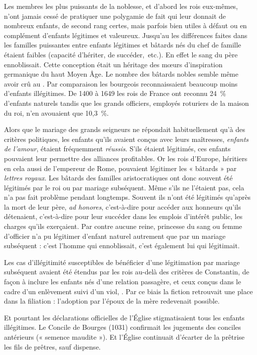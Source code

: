  Les membres les plus puissants de la noblesse, et d'abord les rois eux-mêmes, n'ont jamais cessé de pratiquer une polygamie de fait qui leur donnait de nombreux enfants, de second rang certes, mais parfois bien utiles à défaut ou en complément d'enfants légitimes et valeureux. Jusqu'au  les différences faites dans les familles puissantes entre enfants légitimes et bâtards nés du chef de famille étaient faibles (capacité d'hériter, de succéder,~etc.). En effet le sang du père ennoblissait. Cette conception était un héritage des mœurs d'inspiration germanique du haut Moyen Âge. Le nombre des bâtards nobles semble même avoir crû au  . Par comparaison les bourgeois reconnaissaient beaucoup moins d'enfants illégitimes. De 1400 à 1649 les rois de France ont reconnu 24~\% d'enfants naturels tandis que les grands officiers, employés roturiers de la maison du roi, n'en avouaient que 10,3~\%. 

 Alors que le mariage des grands seigneurs ne répondait habituellement qu'à des critères politiques, les enfants qu'ils avaient conçus avec leurs maîtresses, \emph{enfants de l'amour}, étaient fréquemment \emph{réussis}. S'ils étaient légitimés, ces enfants pouvaient leur permettre des alliances profitables. Or les rois d'Europe, héritiers en cela aussi de l'empereur de Rome, pouvaient légitimer les « bâtards » par \emph{lettres royaux}. Les bâtards des familles aristocratiques ont donc souvent été légitimés par le roi ou par mariage subséquent. Même s'ils ne l'étaient pas, cela n'a pas fait problème pendant longtemps. Souvent ils n'ont été légitimés qu'après la mort de leur père, \emph{ad honores}, c'est-à-dire pour accéder aux honneurs qu'ils détenaient, c'est-à-dire pour leur succéder dans les emplois d'intérêt public, les charges qu'ils exerçaient. Par contre aucune reine, princesse du sang ou femme d'officier n'a pu légitimer d'enfant naturel autrement que par un mariage subséquent : c'est l'homme qui ennoblissait, c'est également lui qui légitimait. 

 Les cas d'illégitimité susceptibles de bénéficier d'une légitimation par mariage subséquent avaient été étendus par les rois au-delà des critères de Constantin, de façon à inclure les enfants nés d'une relation passagère, et ceux conçus dans le cadre d'un enlèvement suivi d'un viol, . Par ce biais la fiction retrouvait une place dans la filiation : l'adoption par l'époux de la mère redevenait possible. 

 Et pourtant les déclarations officielles de l'Église stigmatisaient tous les enfants illégitimes. Le Con\-ci\-le de Bourges (1031) confirmait les jugements des conciles antérieurs (« semence maudite »). Et l'Église continuait d'écarter de la prêtrise les fils de prêtres, sauf dispense. 

